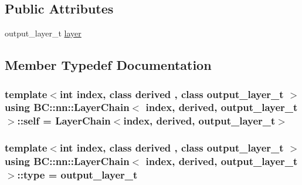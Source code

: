 \subsection*{Public Attributes}
\begin{DoxyCompactItemize}
\item 
output\+\_\+layer\+\_\+t \hyperlink{structBC_1_1nn_1_1LayerChain_3_01index_00_01derived_00_01output__layer__t_01_4_a090c4320f0cd55d0c75f41c948497bde}{layer}
\end{DoxyCompactItemize}


\subsection{Member Typedef Documentation}
\subsubsection[{\texorpdfstring{self}{self}}]{\setlength{\rightskip}{0pt plus 5cm}template$<$int index, class derived , class output\+\_\+layer\+\_\+t $>$ using {\bf B\+C\+::nn\+::\+Layer\+Chain}$<$ index, derived, output\+\_\+layer\+\_\+t $>$\+::{\bf self} =  {\bf Layer\+Chain}$<$index, derived, output\+\_\+layer\+\_\+t$>$}\hypertarget{structBC_1_1nn_1_1LayerChain_3_01index_00_01derived_00_01output__layer__t_01_4_a49c206bb8331c9fa003194ad9c33a30f}{}\label{structBC_1_1nn_1_1LayerChain_3_01index_00_01derived_00_01output__layer__t_01_4_a49c206bb8331c9fa003194ad9c33a30f}
\subsubsection[{\texorpdfstring{type}{type}}]{\setlength{\rightskip}{0pt plus 5cm}template$<$int index, class derived , class output\+\_\+layer\+\_\+t $>$ using {\bf B\+C\+::nn\+::\+Layer\+Chain}$<$ index, derived, output\+\_\+layer\+\_\+t $>$\+::{\bf type} =  output\+\_\+layer\+\_\+t}\hypertarget{structBC_1_1nn_1_1LayerChain_3_01index_00_01derived_00_01output__layer__t_01_4_a0c63b4c0ab7b39412bff5581bc33db5d}{}\label{structBC_1_1nn_1_1LayerChain_3_01index_00_01derived_00_01output__layer__t_01_4_a0c63b4c0ab7b39412bff5581bc33db5d}


